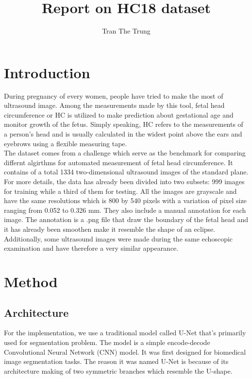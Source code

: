 \documentclass{article}
\title{Report on HC18 dataset}
\author{Tran The Trung}
\begin{document}
\maketitle

\section{Introduction}

During pregnancy of every women, people have tried to make the most of
ultrasound image. Among the measurements made by this tool, fetal head
circumference or HC is utilized to make prediction about gestational age
and monitor growth of the fetus. Simply speaking, HC refers to the
measurements of a person's head and is usually calculated in the widest
point above the ears and eyebrows using a flexible measuring tape.\\

\noindent The dataset comes from a challenge which serve as the benchmark for comparing
differnt algirthms for automated measurement of fetal head circumference.
It contains of a total 1334 two-dimensional ultrasound images
of the standard plane. For more details, the data has already been
divided into two subsets: 999 images for training while a third of them
for testing. All the images are grayscale and have the same resolutions
which is 800 by 540 pixels with a variation of pixel size ranging from
0.052 to 0.326 mm. They also include a manual annotation for each image.
The annotation is a .png file that draw the boundary of the fetal head and it
has already been smoothen make it resemble the shape of an eclipse.
Additionally, some ultrasound images were made during the same echoscopic
examination and have therefore a very similar appearance.\\

\section{Method}

\subsection{Architecture}
For the implementation, we use a traditional model called U-Net that's
primarily used for segmentation problem. The model is a simple
encode-decode Convolutional Neural Network (CNN) model. It was first
designed for biomedical image segmentation tasks. The reason it was named U-Net
is because of its architecture making of two symmetric branches
which resemble the U-shape.\\
\end{document}
